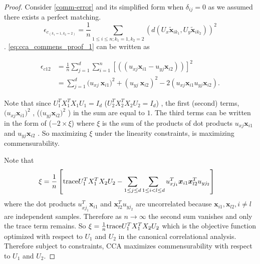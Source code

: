 \documentclass[12pt,oneside,final]{thesis}\usepackage[]{graphicx}\usepackage[]{color}
\begin{document}
\begin{proof}
 Consider \ref{comm-error} and its simplified form when $\delta_{ij}=0$ as we assumed there exists a perfect matching. 
 \[\epsilon_{c_{(k_1=1,k_2=2)}} = \frac{1}{n} \sum_{1 \leq i \leq n;k_1=1,k_2=2} (d(U_x\widetilde{\bm{x}}_{ik_1},U_y \widetilde{\bm{x}}_{ik_2}))^2
\label{eq:cca_commens_proof_1}\]
. \ref{eq:cca_commens_proof_1} can be written as

\begin{align*}
\epsilon_{c12} &=  \frac{1}{n}  \sum_{j=1}^d \sum_{i=1}^n \left[((u_{xj}{\bm{x}}_{i1}-u_{yj} {\bm{x}}_{i2}))\right]^2 \\
&=  \sum_{j=1}^d {(u_{xj}\ {\bm{x}}_{i1}})^2+ ( u_{yj} \ {\bm{x}}_{i2})^2 - 2 (u_{xj}  {\bm{x}}_{i1} u_{yj}  {\bm{x}}_{i2}).
\end{align*}


Note that since $U_1^{T}X_1^{T}X_1U_1=I_d$ ($U_2^{T}X_2^{T}X_2U_2=I_d$) , the first (second) terms, ${(u_{xj} {\bm{x}}_{i1}})^2  $ , 
(${(u_{yj} {\bm{x}}_{i2}})^2 $ )
in the sum are equal to  $1$. The third terms can be written in the form of  ($ -2 \times \xi$) where $\xi$ is the sum of the products of dot products  $u_{xj}  {\bm{x}}_{i1}$ and  $u_{yj}  {\bm{x}}_{i2}$  . So maximizing $\xi$ under the linearity constraints,  is maximizing  commensurability.


Note that 
\begin{align*}
\xi &=  \frac{1}{n} \left[ \textup{trace}{U_1^{T}X_1^{T}X_2U_2} - \sum_{1 \leq j \leq d} \sum_{1 \leq i < l \leq d} u_{xj_1}^T  {\bm{x}}_{i1}  {\bm{x}}_{l2}^T u_{yj_2} \right]
\end{align*}
where the dot products $u_{xj_1}^T  {\bm{x}}_{i1}$ and  $ {\bm{x}}_{l2}^T u_{yj_2}$  are uncorrelated because ${\bm{x}}_{i1},{\bm{x}}_{l2}, i \neq l$  are independent samples. Therefore as $n \rightarrow \infty$ the second sum vanishes and only the trace term remains.  
So $\xi= \frac{1}{n}\textup{trace}{U_1^{T}X_1^{T}X_2U_2}$ which is the objective function optimized with respect to $U_1$ and $U_2$ in the canonical correlational analysis. Therefore subject to constraints, CCA maximizes commensurability  with respect to $U_1$ and $U_2$.

\end{proof}
\end{document}
